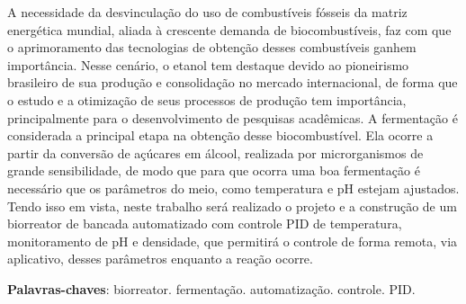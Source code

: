 \begin{resumo}
  A necessidade da desvinculação do uso de combustíveis fósseis da matriz energética mundial, aliada à crescente demanda de biocombustíveis, faz com que o aprimoramento das tecnologias de obtenção desses combustíveis ganhem importância. Nesse cenário, o etanol tem destaque devido ao pioneirismo brasileiro de sua produção e consolidação no mercado internacional, de forma que o estudo e a otimização de seus processos de produção tem importância, principalmente para o desenvolvimento de pesquisas acadêmicas. A fermentação é considerada a principal etapa na obtenção desse biocombustível. Ela ocorre a partir da conversão de açúcares em álcool, realizada por microrganismos de grande sensibilidade, de modo que para que ocorra uma boa fermentação é necessário que os parâmetros do meio, como temperatura e pH estejam ajustados. Tendo isso em vista, neste trabalho será realizado o projeto e a construção de um biorreator de bancada automatizado com controle PID de temperatura, monitoramento de pH e densidade, que permitirá o controle de forma remota, via aplicativo, desses parâmetros enquanto a reação ocorre.


 \vspace{\onelineskip}

 \noindent
 \textbf{Palavras-chaves}: biorreator. fermentação. automatização. controle. PID.
\end{resumo}
